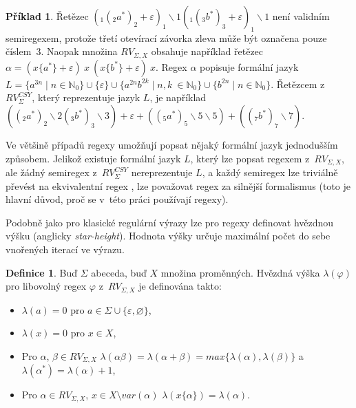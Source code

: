 \documentclass[thesis=B,czech]{FITthesis}[2019/12/23]
\theoremstyle{definition}
\newtheorem{definition}{Definice}[chapter]
\newtheorem{example}{Příklad}[chapter]
\begin{document}
\begin{example} 
Řetězec $(_1(_2 a^\ast )_2 + \varepsilon)_1 \backslash 1 (_1 (_3 b^\ast )_3 + \varepsilon )_1 \backslash 1 $ není validním semiregexem, protože třetí otevírací závorka zleva může být označena pouze číslem~3.  Naopak množina $RV_{\Sigma, X}$ obsahuje například řetězec $\alpha = (x \{ a^\ast \} +  \varepsilon)\  x \ (x\{b^\ast \} +  \varepsilon) \ x$. Regex $\alpha$ popisuje formální jazyk $L = \{a^{3n} \mid n \in \mathbb{N}_0 \} \cup \{\varepsilon\} \cup {\{a^{2n} b^{2k} \mid n, k~\in \mathbb{N}_0 \}} \cup \{b^{2n} \mid n \in \mathbb{N}_0 \}$. Řetězcem z~$RV_{\Sigma}^{CSY}$, který reprezentuje jazyk $L$, je například $((_2 a^\ast )_2 \backslash 2 (_3 b^\ast )_3  \backslash 3) + \varepsilon + ((_5 a^\ast )_5 \backslash 5 \backslash 5) + ((_7 b^\ast )_7 \backslash 7) $.
\end{example}

Ve většině případů regexy umožňují popsat nějaký formální jazyk jednodušším způsobem. Jelikož existuje formální jazyk $L$, který lze popsat regexem z~$RV_{\Sigma, X}$, ale žádný semiregex z~$RV_{\Sigma}^{CSY}$ nereprezentuje $L$, a každý semiregex lze triviálně převést na ekvivalentní regex \cite[s. 38--40]{berglund}, lze považovat regex za silnější formalismus (toto je hlavní důvod, proč se v~této práci používají regexy).

Podobně jako pro klasické regulární výrazy \cite{eggan} lze pro regexy definovat hvězdnou výšku (anglicky \emph{star-height}). Hodnota výšky určuje maximální počet do sebe vnořených iterací ve výrazu. 

\begin{definition}
Buď $\Sigma$ abeceda, buď $X$ množina proměnných. Hvězdná výška $\lambda(\varphi)$ pro libovolný regex $\varphi$ z~$RV_{\Sigma, X}$ je definována takto:
\begin{itemize}
	\item{$\lambda(a) = 0$ pro $a \in \Sigma\cup\{\varepsilon, \varnothing\}$,}
	\item{$\lambda(x) = 0$ pro $x \in X$,}
	\item{Pro $\alpha$, $\beta \in RV_{\Sigma, X}$ $\lambda(\alpha\beta) = \lambda(\alpha+\beta) = max\{\lambda(\alpha), \lambda(\beta)\}$ a  $\lambda(\alpha^\ast) = \lambda(\alpha)+1$,}
	\item{Pro $\alpha \in RV_{\Sigma, X}$, $x \in X\setminus var(\alpha)$ $\lambda(x\{\alpha\}) = \lambda(\alpha)$.}
\end{itemize}
\end{definition}
\end{document}
